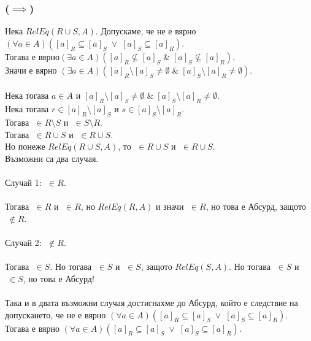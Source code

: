 \documentclass[12pt]{article}
\begin{document}
\subsubsection*{(\(\implies\))}
Нека \(RelEq(R \cup S, A)\).
Допускаме, че не е вярно
\\
\((\forall a \in A)([a]_R \subseteq [a]_S \; \lor \; [a]_S \subseteq [a]_R)\).
\\
Тогава е вярно\((\exists a \in A)([a]_R \not\subseteq [a]_S \; \& \; [a]_S \not\subseteq [a]_R)\).
\\
Значи е вярно
\((\exists a \in A)([a]_R \setminus [a]_S \neq \emptyset \; \& \; [a]_S \setminus [a]_R \neq \emptyset)\).
\\
\vspace{1mm}
\\
Нека тогава \(a \in A\) и \([a]_R \setminus [a]_S \neq \emptyset \; \& \; [a]_S \setminus [a]_R \neq \emptyset\).
\\
Нека тогава \(r \in [a]_R \setminus [a]_S\) и \(s \in [a]_S \setminus [a]_R\).
\\
Тогава \(<a, r> \; \in R \setminus S\) и \(<a, s> \; \in S \setminus R\).
\\
Тогава \(<a, r> \; \in R \cup S\) и \(<a, s> \; \in R \cup S\).
\\
Но понеже \(RelEq(R \cup S, A)\), то \(<r, a> \; \in R \cup S\) и \(<r, s> \; \in R \cup S\).
\\
Възможни са два случая.
\\
\vspace{1mm}
\\
Случай 1: \(<r, s> \; \in R\).
\\
\vspace{1mm}
\\
Тогава \(<a, r> \; \in R\) и \(<r, s> \; \in R\), но \(RelEq(R, A)\)
и значи \(<a, s> \; \in R\), но това е Абсурд, защото \(<a, s> \; \notin R\).
\\
\vspace{1mm}
\\
Случай 2: \(<r, s> \; \notin R\).
\\
\vspace{1mm}
\\
Тогава \(<r, s> \; \in S\). Но тогава \(<s, a> \; \in S\)
и \(<r, s> \; \in S\), защото \(RelEq(S, A)\).
Но тогава \(<r, a> \; \in S\) и \(<a, r> \; \in S\), но това е Абсурд!
\\
\vspace{1mm}
\\
Така и в двата възможни случая достигнахме до Абсурд,
който е следствие на допускането, че не е вярно
\((\forall a \in A)([a]_R \subseteq [a]_S \; \lor \; [a]_S \subseteq [a]_R)\).
\\
Тогава е вярно
\((\forall a \in A)([a]_R \subseteq [a]_S \; \lor \; [a]_S \subseteq [a]_R)\).
\end{document}
